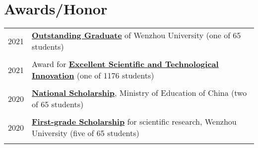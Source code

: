 \documentclass[a4paper,10pt]{article} %
\begin{document}
\section{Awards/Honor}
\begin{tabular}{r|l}	

2021                        & \href{https://nbviewer.org/github/HuangJiaLian/DataBase0/blob/9d45d2d591813a771e408be12a8b8f3a1b06cd44/uPic/2021_11_26_10_1.pdf}{\textbf{Outstanding Graduate}} of Wenzhou University (one of 65 students)\\
\multicolumn{2}{c}{} \\	%

2021        				    & Award for \href{https://nbviewer.org/github/HuangJiaLian/DataBase0/blob/a069cea80af4ab070c9214480c666d4de1e5a054/uPic/2021_11_26_10_3.pdf}{\textbf{Excellent Scientific and Technological Innovation}} (one of 1176 students)\\
\multicolumn{2}{c}{} \\	%

2020                        & \href{https://nbviewer.org/github/HuangJiaLian/DataBase0/blob/84275fe6b9b504ce06b182972187707c372b4123/uPic/2021_11_26_10_N.pdf}{\textbf{National Scholarship}}, Ministry of Education of China (two of 65 students)\\   	
\multicolumn{2}{c}{} \\	%

2020                           & \href{https://nbviewer.org/github/HuangJiaLian/DataBase0/blob/ca47411a77d87d5af5ebc2c175a9b334642c6f48/uPic/2021_11_26_10_4.pdf}{\textbf{First-grade Scholarship}} for scientific research, Wenzhou University (five of 65 students)\\
\multicolumn{2}{c}{} \\	%

%



\end{tabular}
\end{document}
